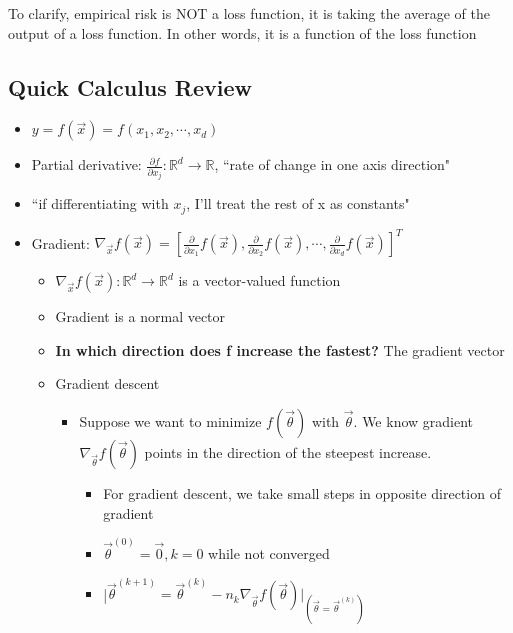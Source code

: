 \documentclass[10pt, oneside]{article}
\newcommand{\R}{\mathbb{R}}
\begin{document}
To clarify, empirical risk is NOT a loss function, it is taking the average of the output of a loss function. In other words, it is a function of the loss function

\subsection{Quick Calculus Review}
\begin{itemize}
    \item $y=f(\vec x)=f(x_1,x_2,\cdots,x_d)$
    \item Partial derivative: $\frac{\partial f}{\partial x_j} : \R^d\rightarrow \R$, ``rate of change in one axis direction"
    \item ``if differentiating with $x_j$, I'll treat the rest of x as constants"
    \item Gradient: $\nabla_{\vec x} f(\vec x) = [\frac{\partial}{\partial x_1} f(\vec x), \frac{\partial}{\partial x_2} f(\vec x),\cdots, \frac{\partial}{\partial x_d} f(\vec x)]^T$
    \begin{itemize}
        \item $\nabla_{\vec x} f(\vec x) : \R^d \rightarrow \R^d$ is a vector-valued function
        \item Gradient is a normal vector
        \item \textbf{In which direction does f increase the fastest?} The gradient vector
        \item Gradient descent
        \begin{itemize}
            \item Suppose we want to minimize $f(\vec \theta)$ with $\vec \theta$. We know gradient $\nabla_{\vec \theta} f(\vec \theta)$ points in the direction of the steepest increase.
            \begin{itemize}
                \item For gradient descent, we take small steps in opposite direction of gradient
                \item $\vec \theta^{(0)} = \vec 0, k=0$ while not converged
                \item |$\vec \theta^{(k+1)} = \vec \theta ^{(k)} - n_k \nabla_{\vec \theta} f(\vec \theta) |_{(\vec \theta = \vec \theta^{(k)})}$
            \end{itemize}
        \end{itemize}
    \end{itemize}
\end{itemize}
\end{document}
